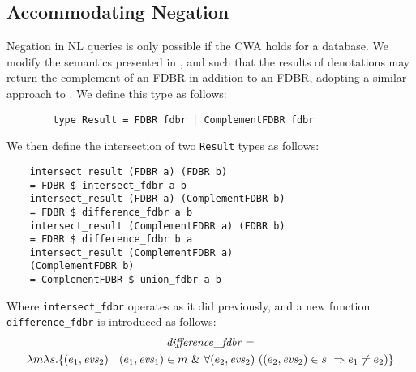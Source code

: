 \documentclass[../main.tex]{subfiles}
\begin{document}
\begin{refsection}
%
%

\section{Accommodating Negation}
\label{sec:negation}
\noindent Negation in NL queries is only possible if the CWA holds for a database.  We modify
the semantics presented in \cite{frostpeelar2019}, \cite{frost2018extensible} and \cite{peelar2020compositional} such that the results of denotations may return the complement of an FDBR in addition to an FDBR, adopting a similar approach to \cite{frostboulos2002}.  We define this type as follows:
\begin{small}
	\begin{verbatim}
		type Result = FDBR fdbr | ComplementFDBR fdbr
	\end{verbatim}
\end{small}
We then define the intersection of two \texttt{Result} types as follows:
\begin{small}
	\begin{verbatim}
    intersect_result (FDBR a) (FDBR b)
    = FDBR $ intersect_fdbr a b
    intersect_result (FDBR a) (ComplementFDBR b)
    = FDBR $ difference_fdbr a b
    intersect_result (ComplementFDBR a) (FDBR b)
    = FDBR $ difference_fdbr b a
    intersect_result (ComplementFDBR a)
    (ComplementFDBR b)
    = ComplementFDBR $ union_fdbr a b
	\end{verbatim}
\end{small}
Where \texttt{intersect\_fdbr} operates as it did previously, and a new function \linebreak \texttt{difference\_fdbr} is introduced as follows:
\begin{multline*}
\mathit{difference\_fdbr} = \\ \lambda m \lambda s.\{(e_1,\evs_2)\ |\ (e_1,\evs_1) \in m\ \&\ \forall(e_2, \evs_2)\ ((e_2,\evs_2) \in s\ \Rightarrow e_1 \neq e_2)\}

\end{multline*}
\end{refsection}
\end{document}
